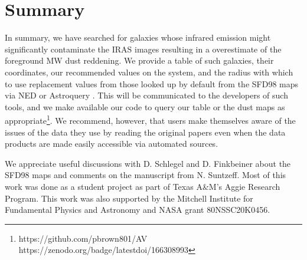 \documentclass[twocolumn]{aastex63}
\begin{document}
\section{Summary\label{sec_summary}}

In summary, we have searched for galaxies whose infrared emission might significantly contaminate the IRAS images resulting in a overestimate of the foreground MW dust reddening.  We provide a table of such galaxies, their coordinates, our recommended values on the \citet{Schlafly_Finkbeiner_2011} system, and the radius with which to use replacement values from those looked up by default from the SFD98 maps via NED or Astroquery \citep{Ginsburg_etal_2019}.  This will be communicated to the developers of such tools, and we make available our code to query our table or the dust maps as appropriate\footnote{https://github.com/pbrown801/AV https://zenodo.org/badge/latestdoi/166308993}.  We recommend, however, that users make themselves aware of the issues of the data they use by reading the original papers even when the data products are made easily accessible via automated sources.

\acknowledgments
We appreciate useful discussions with D. Schlegel and D. Finkbeiner about the SFD98 maps and comments on the manuscript from N. Suntzeff.  Most of this work was done as a student project as part of Texas A\&M's Aggie Research Program.  This work was also supported by the Mitchell Institute for Fundamental Physics and Astronomy and NASA grant 80NSSC20K0456. 


\vspace{5cm}


\clearpage


{}

\clearpage
\begin{longrotatetable}

\end{longrotatetable}
\end{document}
